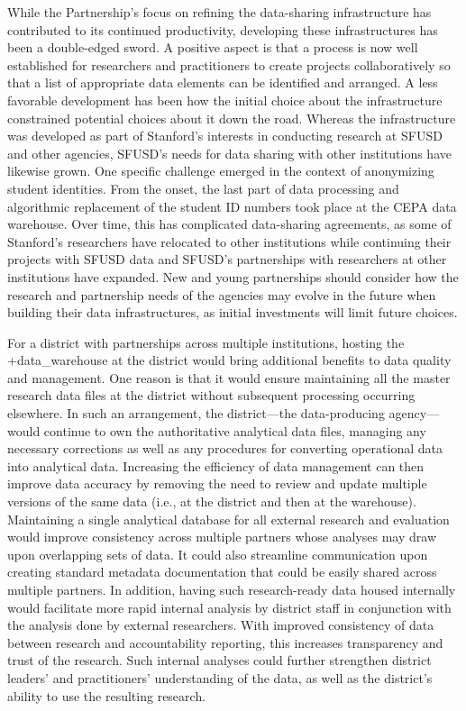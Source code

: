 \documentclass[
]{WileySix}
\begin{document}
While the Partnership's focus on refining the data-sharing infrastructure has contributed to its continued productivity, developing these infrastructures has been a double-edged sword. A positive aspect is that a process is now well established for researchers and practitioners to create projects collaboratively so that a list of appropriate data elements can be identified and arranged. A less favorable development has been how the initial choice about the infrastructure constrained potential choices about it down the road. Whereas the infrastructure was developed as part of Stanford's interests in conducting research at SFUSD and other agencies, SFUSD's needs for data sharing with other institutions have likewise grown. One specific challenge emerged in the context of anonymizing student identities. From the onset, the last part of data processing and algorithmic replacement of the student ID numbers took place at the CEPA data warehouse. Over time, this has complicated data-sharing agreements, as some of Stanford's researchers have relocated to other institutions while continuing their projects with SFUSD data and SFUSD's partnerships with researchers at other institutions have expanded. New and young partnerships should consider how the research and partnership needs of the agencies may evolve in the future when building their data infrastructures, as initial investments will limit future choices.

For a district with partnerships across multiple institutions, hosting the +data\_warehouse\textbar{} at the district would bring additional benefits to data quality and management. One reason is that it would ensure maintaining all the master research data files at the district without subsequent processing occurring elsewhere. In such an arrangement, the district---the data-producing agency---would continue to own the authoritative analytical data files, managing any necessary corrections as well as any procedures for converting operational data into analytical data. Increasing the efficiency of data management can then improve data accuracy by removing the need to review and update multiple versions of the same data (i.e., at the district and then at the warehouse). Maintaining a single analytical database for all external research and evaluation would improve consistency across multiple partners whose analyses may draw upon overlapping sets of data. It could also streamline communication upon creating standard metadata documentation that could be easily shared across multiple partners. In addition, having such research-ready data housed internally would facilitate more rapid internal analysis by district staff in conjunction with the analysis done by external researchers. With improved consistency of data between research and accountability reporting, this increases transparency and trust of the research. Such internal analyses could further strengthen district leaders' and practitioners' understanding of the data, as well as the district's ability to use the resulting research.
\end{document}
